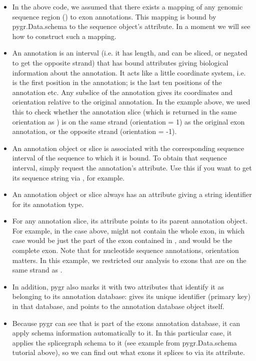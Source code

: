\documentclass{howto}
\begin{document}
\begin{itemize}
\item In the above code, we assumed that there exists a mapping of any genomic
sequence region () to exon annotations.  This mapping
is bound by pygr.Data.schema to the sequence object's  attribute.
In a moment we will see how to construct such a mapping.

\item An annotation is an interval (i.e. it has length, and can be sliced,
or negated to get the opposite strand) that has bound attributes giving
biological information about the annotation.  It acts like a little coordinate
system, i.e.  is the first position in the annotation;
 is the last ten positions of the annotation etc.
Any subslice of the annotation gives its coordinates and orientation
relative to the original annotation.  In the example above, we used this
to check whether the annotation slice  (which is returned 
in the same orientation as ) is on the same strand
(orientation = 1) as the original exon annotation,
or the opposite strand (orientation = -1).

\item An annotation object or slice is associated with the corresponding
sequence interval of the sequence to which it is bound.  To obtain that
sequence interval, simply request the annotation's 
attribute.  Use this if you want to get its sequence string via ,
for example.

\item An annotation object or slice always has an
 attribute giving a string identifier for 
its annotation type.

\item For any annotation slice, its  attribute
points to its parent annotation
object.  For example, in the case above,  might not contain
the whole exon, in which case  would be just the part of the exon
contained in , and  would be the complete
exon.  Note that for nucleotide sequence annotations, orientation matters.
In this example, we restricted our analysis to exons that are on the same
strand as .

\item In addition, pygr also marks it with 
two attributes that identify it as belonging to its annotation database:
 gives its unique identifier (primary key) in that database,
and  points to the annotation database object itself.

\item Because pygr can see that  is part of the exons annotation database,
it can apply schema information automatically to it.  In this particular case,
it applies the splicegraph schema to it (see example from pygr.Data.schema
tutorial above), so we can find out what exons it splices to via its 
attribute.
\end{itemize}
\end{document}
